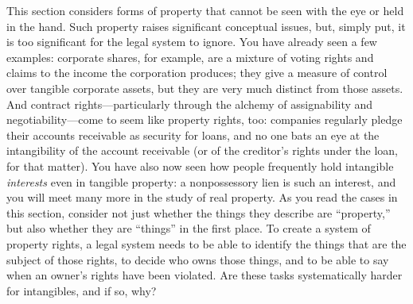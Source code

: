 
This section considers forms of property that cannot be seen with the eye or
held in the hand. Such property raises significant conceptual issues, but,
simply put, it is too significant for the legal system to ignore. You have
already seen a few examples: corporate shares, for example, are a mixture of
voting rights and claims to the income the corporation produces; they give a
measure of control over tangible corporate assets, but they are very much
distinct from those assets. And contract rights---particularly through the
alchemy of assignability and negotiability---come to seem like property
rights, too: companies regularly pledge their accounts receivable as security
for loans, and no one bats an eye at the intangibility of the account
receivable (or of the creditor's rights under the loan, for that matter). You
have also now seen how people frequently hold intangible \textit{interests}
even in tangible property: a nonpossessory lien is such an interest, and you
will meet many more in the study of real property. As you read the cases in
this section, consider not just whether the things they describe are
``property,'' but also whether they are ``things'' in the first place. To
create a system of property rights, a legal system needs to be able to identify
the things that are the subject of those rights, to decide who owns those
things, and to be able to say when an owner's rights have been violated. Are
these tasks systematically harder for intangibles, and if so, why?

